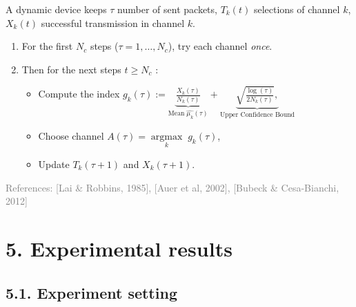 \begin{frameO}

    A dynamic device keeps \(\tau\) number of sent packets, \(T_k(t)\)
    selections of channel \(k\), \(X_k(t)\) successful transmission in
    channel \(k\).

    \begin{enumerate}
        \def\labelenumi{\arabic{enumi}.}
        \tightlist
        \item
              For the first \(N_c\) steps (\(\tau=1,\dots,N_c\)), try each channel
              \emph{once}.
        \item
              Then for the next steps \(t \geq N_c\) :

              \begin{itemize}
                  \tightlist
                  \item
                        Compute the index
                        \(g_k(\tau) := \underbrace{\frac{X_k(\tau)}{N_k(\tau)}}_{\text{Mean}\; \widehat{\mu_k}(\tau)} + \underbrace{\sqrt{\frac{\log(\tau)}{2 N_k(\tau)}},}_{\text{Upper Confidence Bound}}\)
                  \item
                        Choose channel
                        \(A(\tau) = \mathop{\arg\max}\limits_{k} \; g_k(\tau)\),
                  \item
                        Update \(T_k(\tau+1)\) and \(X_k(\tau+1)\).
              \end{itemize}
    \end{enumerate}

    \vfill{}\hfill{}\tiny{\textcolor{gray}{References: [Lai \& Robbins, 1985], [Auer et al, 2002], [Bubeck \& Cesa-Bianchi, 2012]}}

\end{frameO}



\section{\hfill{}5. Experimental results\hfill{}}

\subsection{\hfill{}5.1. Experiment setting\hfill{}}

